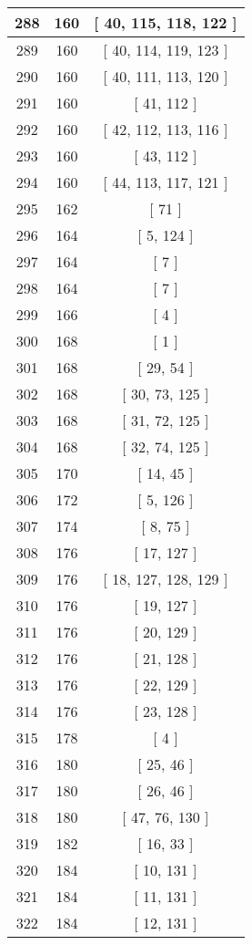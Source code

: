 \begin{center}
\begin{longtable}[H]{|| c c c ||}
\hline
288 & 160 & [ 40, 115, 118, 122 ] \\ 
\hline
289 & 160 & [ 40, 114, 119, 123 ] \\ 
\hline
290 & 160 & [ 40, 111, 113, 120 ] \\ 
\hline
291 & 160 & [ 41, 112 ] \\ 
\hline
292 & 160 & [ 42, 112, 113, 116 ] \\ 
\hline
293 & 160 & [ 43, 112 ] \\ 
\hline
294 & 160 & [ 44, 113, 117, 121 ] \\ 
\hline
295 & 162 & [ 71 ] \\ 
\hline
296 & 164 & [ 5, 124 ] \\ 
\hline
297 & 164 & [ 7 ] \\ 
\hline
298 & 164 & [ 7 ] \\ 
\hline
299 & 166 & [ 4 ] \\ 
\hline
300 & 168 & [ 1 ] \\ 
\hline
301 & 168 & [ 29, 54 ] \\ 
\hline
302 & 168 & [ 30, 73, 125 ] \\ 
\hline
303 & 168 & [ 31, 72, 125 ] \\ 
\hline
304 & 168 & [ 32, 74, 125 ] \\ 
\hline
305 & 170 & [ 14, 45 ] \\ 
\hline
306 & 172 & [ 5, 126 ] \\ 
\hline
307 & 174 & [ 8, 75 ] \\ 
\hline
308 & 176 & [ 17, 127 ] \\ 
\hline
309 & 176 & [ 18, 127, 128, 129 ] \\ 
\hline
310 & 176 & [ 19, 127 ] \\ 
\hline
311 & 176 & [ 20, 129 ] \\ 
\hline
312 & 176 & [ 21, 128 ] \\ 
\hline
313 & 176 & [ 22, 129 ] \\ 
\hline
314 & 176 & [ 23, 128 ] \\ 
\hline
315 & 178 & [ 4 ] \\ 
\hline
316 & 180 & [ 25, 46 ] \\ 
\hline
317 & 180 & [ 26, 46 ] \\ 
\hline
318 & 180 & [ 47, 76, 130 ] \\ 
\hline
319 & 182 & [ 16, 33 ] \\ 
\hline
320 & 184 & [ 10, 131 ] \\ 
\hline
321 & 184 & [ 11, 131 ] \\ 
\hline
322 & 184 & [ 12, 131 ] \\ 

\end{longtable}
\end{center}
